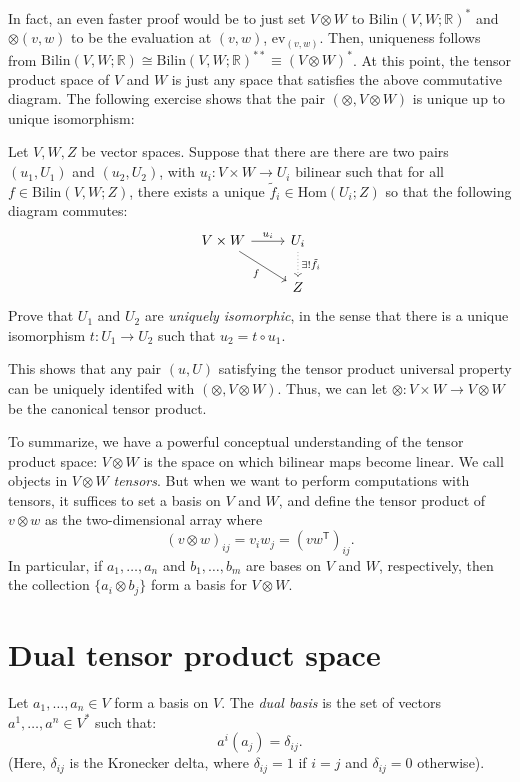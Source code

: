 In fact, an even faster proof would be to just set $V \otimes W$ to $\mathrm{Bilin}(V,W;\mathbb{R})^*$ and $\otimes (v,w)$ to be the evaluation at $(v,w)$, $\mathrm{ev}_{(v,w)}$. Then, uniqueness follows from $\mathrm{Bilin}(V,W;\mathbb{R}) \cong   \mathrm{Bilin}(V,W;\mathbb{R})^{**} \equiv (V \otimes W)^*$. At this point, the tensor product space of $V$ and $W$ is just any space that satisfies the above commutative diagram. The following exercise shows that the pair $(\otimes, V \otimes W)$ is unique up to unique isomorphism:

\begin{exercise}
  Let $V,W,Z$ be vector spaces. Suppose that there are there are two pairs $(u_1,U_1)$ and $(u_2,U_2)$, with $u_i : V \times W \to U_i$  bilinear such that for all $f \in \mathrm{Bilin}(V,W;Z)$, there exists a unique $\tilde{f}_i \in \mathrm{Hom}(U_i; Z)$ so that the following diagram commutes:
  \[\begin{tikzcd}
V \times W \arrow{r}{u_i} \arrow[swap]{dr}{f} & U_i \arrow[dotted]{d}{\exists !\tilde{f}_i} \\
& Z
  \end{tikzcd}\]
  Prove that $U_1$ and $U_2$ are \emph{uniquely isomorphic}, in the sense that there is a unique isomorphism $t: U_1 \to U_2$ such that $u_2 = t \circ u_1$. 
\end{exercise}

This shows that any pair $(u,U)$ satisfying the tensor product universal property can be uniquely identifed with $(\otimes, V \otimes W)$. Thus, we can let  $\otimes : V \times W \to V \otimes W$ be the canonical tensor product.


To summarize, we have a powerful conceptual understanding of the tensor product space: $V \otimes W$ is the space on which bilinear maps become linear. We call objects in $V \otimes W$ \emph{tensors}. But when we want to perform computations with tensors, it suffices to set a basis on $V$ and $W$, and define the tensor product of $v \otimes w$ as the two-dimensional array where
\[(v\otimes w)_{ij} = v_i w_j = \left(vw^\mathsf{T}\right)_{ij}.\]
In particular, if $a_1,\dotsc, a_n$ and $b_1,\dotsc, b_m$ are bases on $V$ and $W$, respectively, then the collection $\{a_i\otimes b_j\}$ form a basis for $V \otimes W$.


\section{Dual tensor product space}
\begin{definition}
  Let $a_1,\dotsc, a_n \in V$ form a basis on $V$. The \emph{dual basis} is the set of vectors $a^1, \dotsc, a^n \in V^*$ such that:
  \[a^i(a_j) = \delta_{ij}.\]
  (Here, $\delta_{ij}$ is the Kronecker delta, where $\delta_{ij} = 1$ if $i = j$ and $\delta_{ij} = 0$ otherwise).
\end{definition}

